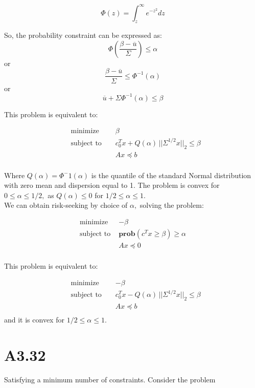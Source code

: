 \documentclass{article}
\begin{document}
$$\Phi(z) = \int_{z}^{\infty} e^{- z^2} dz$$

So, the probability constraint can be expressed as:
$$
\Phi(\frac{\beta - \overline u}{\Sigma}) \leq \alpha
$$
or
$$
\frac{\beta - \overline u}{\Sigma} \leq \Phi ^ {-1}(\alpha)
$$
or
$$
\overline u + \Sigma \Phi ^ {-1}(\alpha) \leq \beta
$$


This problem is equivalent to:

\begin{align*}
&\text{minimize } && \beta \\
&\text{subject to } && c_0^T x + Q(\alpha) \, 
||\Sigma^{1/2} x||_2 \leq \beta\\
& &&A x \preceq b \\
\end{align*} 

Where $Q(\alpha) = \Phi^-1(\alpha)$ is the quantile of the standard Normal distribution with zero mean and dispersion equal to 1. 
The problem is convex for $0 \leq \alpha \leq 1/2,$ as $Q(\alpha) \leq 0$ for $1/2 \leq \alpha \leq 1.$
\\

We can obtain risk-seeking by choice of $\alpha,$ solving the problem:

\begin{align*}
\text{minimize } &- \beta \\
\text{subject to } &\boldsymbol{prob}(c^T x \geq \beta ) \geq \alpha \\
&A x \preceq 0 \\
\end{align*} 

This problem is equivalent to:

\begin{align*}
&\text{minimize } && - \beta \\
&\text{subject to } && c_0^T x - Q(\alpha) \, 
||\Sigma^{1/2} x||_2 \leq \beta\\
& &&A x \preceq b \\
\end{align*} 
and it is convex for $1/2 \leq \alpha \leq 1.$

\section*{A3.32}

Satisfying a minimum number of constraints. Consider the problem
\end{document}
